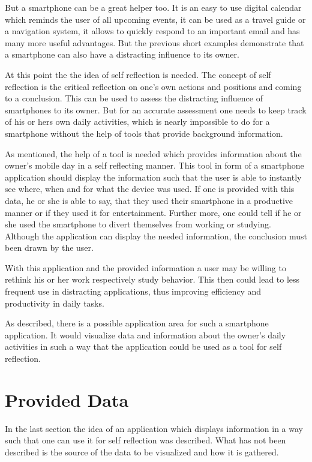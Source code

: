 But a smartphone  can be a great helper too. It is an easy to use digital calendar which reminds the user of all upcoming events, it can be used as a travel guide or a navigation system, it allows to quickly respond to an important email and has many more useful advantages. But the previous short examples demonstrate that a smartphone can also have a distracting influence to its owner.

At this point the the idea of self reflection is needed. The concept of self reflection is the critical reflection on one's own actions and positions and coming to a conclusion. This can be used to assess the distracting influence of smartphones to its owner. But for an accurate assessment one needs to keep track of his or hers own daily activities, which is nearly impossible to do for a smartphone without the help of tools that provide background information.

As  mentioned, the help of a tool is needed which provides information about the owner's mobile day in a self reflecting manner. This tool in form of a smartphone application should display the information such that the user is able to instantly see where, when and for what the device was used. If one is provided with this data, he or she is able to say, that they used their smartphone in a productive manner or if they used it for entertainment. Further more, one could tell if he or she used the smartphone to divert themselves from working or studying. Although the application can display the needed information, the conclusion must been drawn by the user.

With  this application and the provided information a user may be willing to rethink his or her work respectively study behavior. This then could lead to less frequent use in distracting applications, thus improving efficiency and productivity in daily tasks.

As described, there is a possible application area for such a smartphone application. It would visualize data and information about the owner's daily activities in such a way that the application could be used as a tool for self reflection.

\newpage
\section{Provided Data}
In the last section the idea of an application which displays information in a way such that one can use it for self reflection was described. What has not been described is the source of the data to be visualized and how it is gathered.

